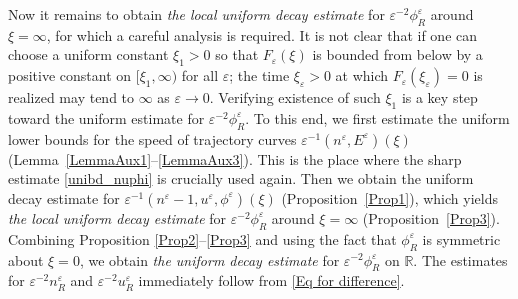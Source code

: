 \documentclass{amsart}
\newcommand{\veps}{\varepsilon}
\numberwithin{equation}{section}
\theoremstyle{plain}%
\theoremstyle{definition}
\theoremstyle{remark}
\theoremstyle{remark}
\begin{document}
Now it remains to obtain \textit{the local uniform decay estimate} for $\veps^{-2}\phi_R^\veps$ around $\xi=\infty$,
for which  a careful analysis is required. It is not clear that if one can choose a uniform constant $\xi_1>0$ so that $F_\veps(\xi)$ is bounded from below by a positive constant on $[\xi_1,\infty)$ for all $\veps$; the time $\xi_\veps>0$ at which $F_\veps(\xi_\veps)=0$ is realized may tend to $\infty$ as $\veps \to 0$. Verifying existence of such $\xi_1$ is a key step toward the uniform estimate for $\veps^{-2}\phi_R^\veps$.
To this end, we first estimate the uniform lower bounds for the speed of trajectory curves $\veps^{-1}(n^\veps,E^\veps)(\xi)$ (Lemma~\ref{LemmaAux1}--\ref{LemmaAux3}). This is the place where the sharp estimate \eqref{unibd_nuphi} is crucially used again. Then we obtain the uniform decay estimate for $\veps^{-1}(n^\veps-1,u^\veps,\phi^\veps)(\xi)$ (Proposition~\ref{Prop1}), which yields \textit{the local uniform decay estimate} for $\veps^{-2}\phi_R^\veps$ around $\xi=\infty$ (Proposition~\ref{Prop3}). Combining Proposition \ref{Prop2}--\ref{Prop3} and using the fact that $\phi_R^\veps$ is symmetric about $\xi=0$, we obtain \textit{the uniform decay estimate} for $\veps^{-2}\phi_R^\veps$ on $\mathbb{R}$. 
The estimates for $\veps^{-2}n_R^\veps$ and $\veps^{-2}u_R^\veps$  immediately follow from \eqref{Eq for difference}.


\end{document}
